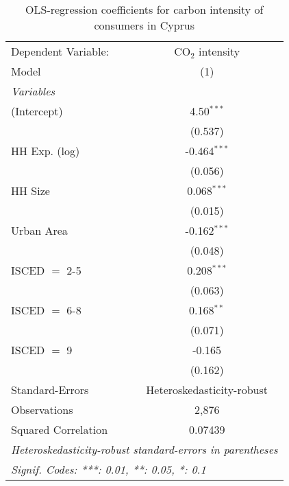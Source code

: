 
\begin{table}[htbp!]
   \centering
   \small
   \begin{adjustbox}{width = 1\textwidth, max height = 0.95\textheight, center}
      \begin{threeparttable}[b]
         \caption{\label{tab:OLS_1_CYP} OLS-regression coefficients for carbon intensity of consumers in Cyprus}
         \begin{tabular}{lc}
            \tabularnewline \midrule \midrule
            Dependent Variable: & CO$_{2}$ intensity\\  
            Model               & (1)\\  
            \midrule
            \emph{Variables}\\
            (Intercept)         & 4.50$^{***}$\\   
                                & (0.537)\\   
            HH Exp. (log)       & -0.464$^{***}$\\   
                                & (0.056)\\   
            HH Size             & 0.068$^{***}$\\   
                                & (0.015)\\   
            Urban Area          & -0.162$^{***}$\\   
                                & (0.048)\\   
            ISCED $=$ 2-5       & 0.208$^{***}$\\   
                                & (0.063)\\   
            ISCED $=$ 6-8       & 0.168$^{**}$\\   
                                & (0.071)\\   
            ISCED $=$ 9         & -0.165\\   
                                & (0.162)\\   
            \midrule 
            Standard-Errors     & Heteroskedasticity-robust \\   
            Observations        & 2,876\\  
            Squared Correlation & 0.07439\\  
            \midrule \midrule
            \multicolumn{2}{l}{\emph{Heteroskedasticity-robust standard-errors in parentheses}}\\
            \multicolumn{2}{l}{\emph{Signif. Codes: ***: 0.01, **: 0.05, *: 0.1}}\\
         \end{tabular}
         

\end{threeparttable}
\end{adjustbox}
\end{table}
